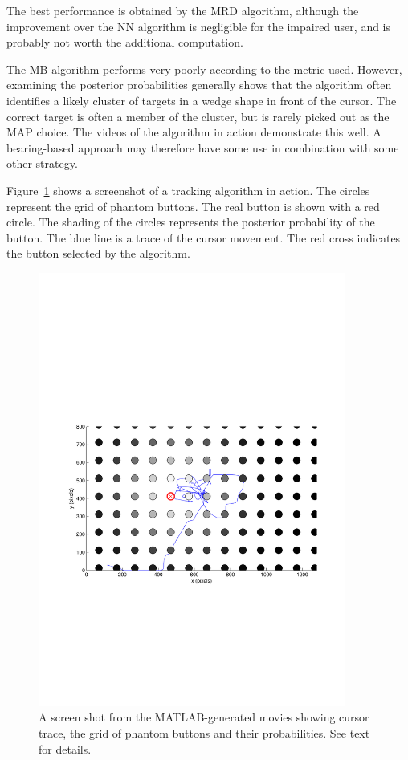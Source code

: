 The best performance is obtained by the MRD algorithm, although the improvement over the NN algorithm is negligible for the impaired user, and is probably not worth the additional computation.

The MB algorithm performs very poorly according to the metric used. However, examining the posterior probabilities generally shows that the algorithm often identifies a likely cluster of targets in a wedge shape in front of the cursor. The correct target is often a member of the cluster, but is rarely picked out as the MAP choice. The videos of the algorithm in action demonstrate this well. A bearing-based approach may therefore have some use in combination with some other strategy.

Figure~\ref{fig:CursorTracking} shows a screenshot of a tracking algorithm in action. The circles represent the grid of phantom buttons. The real button is shown with a red circle. The shading of the circles represents the posterior probability of the button. The blue line is a trace of the cursor movement. The red cross indicates the button selected by the algorithm.

\begin{figure}[hbt]
\centering \includegraphics[width=0.9\textwidth]{MovieScreenshot.pdf}
\caption{A screen shot from the MATLAB-generated movies showing cursor trace, the grid of phantom buttons and their probabilities. See text for details.}
\label{fig:CursorTracking}
\end{figure}